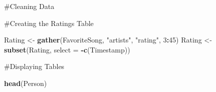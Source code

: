 \documentclass[]{article}
\newenvironment{Shaded}{\begin{snugshade}}{\end{snugshade}}
\newcommand{\DataTypeTok}[1]{\textcolor[rgb]{0.13,0.29,0.53}{#1}}
\newcommand{\DecValTok}[1]{\textcolor[rgb]{0.00,0.00,0.81}{#1}}
\newcommand{\KeywordTok}[1]{\textcolor[rgb]{0.13,0.29,0.53}{\textbf{#1}}}
\newcommand{\NormalTok}[1]{#1}
\newcommand{\OperatorTok}[1]{\textcolor[rgb]{0.81,0.36,0.00}{\textbf{#1}}}
\newcommand{\StringTok}[1]{\textcolor[rgb]{0.31,0.60,0.02}{#1}}
\begin{document}
\#Cleaning Data

\begin{Shaded}
\end{Shaded}

\#Creating the Ratings Table

\begin{Shaded}
\begin{Highlighting}[]
\NormalTok{Rating <-}\StringTok{ }\KeywordTok{gather}\NormalTok{(FavoriteSong, }\StringTok{"artists"}\NormalTok{, }\StringTok{"rating"}\NormalTok{, }\DecValTok{3}\OperatorTok{:}\DecValTok{45}\NormalTok{)}
\NormalTok{Rating <-}\StringTok{ }\KeywordTok{subset}\NormalTok{(Rating, }\DataTypeTok{select =} \OperatorTok{-}\KeywordTok{c}\NormalTok{(Timestamp))}
\end{Highlighting}
\end{Shaded}

\#Displaying Tables

\begin{Shaded}
\begin{Highlighting}[]
\KeywordTok{head}\NormalTok{(Person)}
\end{Highlighting}
\end{Shaded}
\end{document}
